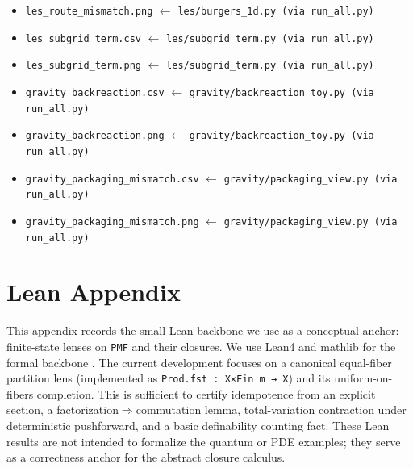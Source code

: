 \documentclass[11pt]{article}
\begin{document}
\begin{itemize}[leftmargin=*,itemsep=0pt]
  \item {\footnotesize \texttt{les\_route\_mismatch.png} $\leftarrow$ \texttt{les/burgers\_1d.py (via run\_all.py)}}
  \item {\footnotesize \texttt{les\_subgrid\_term.csv} $\leftarrow$ \texttt{les/subgrid\_term.py (via run\_all.py)}}
  \item {\footnotesize \texttt{les\_subgrid\_term.png} $\leftarrow$ \texttt{les/subgrid\_term.py (via run\_all.py)}}
  \item {\footnotesize \texttt{gravity\_backreaction.csv} $\leftarrow$ \texttt{gravity/backreaction\_toy.py (via run\_all.py)}}
  \item {\footnotesize \texttt{gravity\_backreaction.png} $\leftarrow$ \texttt{gravity/backreaction\_toy.py (via run\_all.py)}}
  \item {\footnotesize \texttt{gravity\_packaging\_mismatch.csv} $\leftarrow$ \texttt{gravity/packaging\_view.py (via run\_all.py)}}
  \item {\footnotesize \texttt{gravity\_packaging\_mismatch.png} $\leftarrow$ \texttt{gravity/packaging\_view.py (via run\_all.py)}}
\end{itemize}
\normalsize
  


\appendix
\section{Lean Appendix}
\label{app:lean}
This appendix records the small Lean backbone we use as a conceptual anchor: finite-state lenses on \texttt{PMF} and their closures. We use Lean4 and mathlib for the formal backbone \citep{moura2021lean4,mathlib2020lean}. The current development focuses on a canonical equal-fiber partition lens (implemented as \texttt{Prod.fst : X×Fin m → X}) and its uniform-on-fibers completion. This is sufficient to certify idempotence from an explicit section, a factorization$\Rightarrow$commutation lemma, total-variation contraction under deterministic pushforward, and a basic definability counting fact. These Lean results are not intended to formalize the quantum or PDE examples; they serve as a correctness anchor for the abstract closure calculus.
\end{document}
